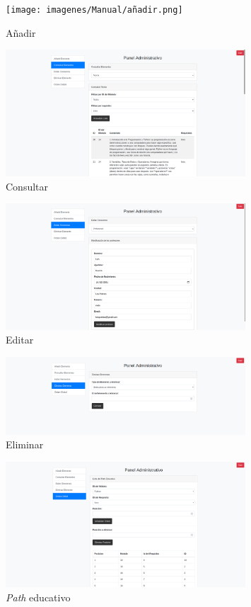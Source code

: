 \begin{appendices}
\begin{figure}[H]
    \centering
    \texttt{[image: imagenes/Manual/añadir.png]}
    \caption{Añadir}
\end{figure}

\begin{figure}[H]
    \centering
    \includegraphics[width=0.8\textwidth]{imagenes/Manual/consultar.png}
    \caption{Consultar}
\end{figure}

\begin{figure}[H]
    \centering
    \includegraphics[width=0.8\textwidth]{imagenes/Manual/editar.png}
    \caption{Editar}
\end{figure}

\begin{figure}[H]
    \centering
    \includegraphics[width=0.8\textwidth]{imagenes/Manual/eliminar.png}
    \caption{Eliminar}
\end{figure}

\begin{figure}[H]
    \centering
    \includegraphics[width=0.8\textwidth]{imagenes/Manual/ordenglobal.png}
    \caption{\textit{Path} educativo}
\end{figure}


\end{appendices}
